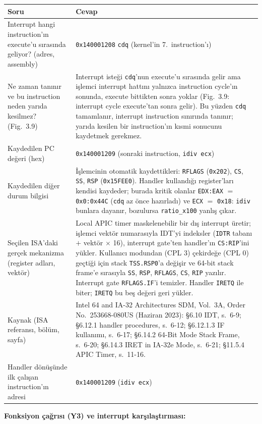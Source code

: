 \documentclass[11pt,a4paper]{article}
\newcommand{\tl}{\texttt}
\newcommand{\hd}[1]{\cellcolor{hdr}#1}
\begin{document}
\begin{longtable}{|p{5.6cm}|p{9.9cm}|}
\hline
\hd{Soru} & \hd{Cevap}\\
\hline
\endhead
Interrupt hangi instruction'ın execute'u sırasında geliyor? (adres, assembly) & \tl{0x140001208} \tl{cdq} (kernel'in 7.~instruction'ı)\\ \hline
Ne zaman tanınır ve bu instruction neden yarıda kesilmez? (Fig.~3.9) & Interrupt isteği \tl{cdq}'nun execute'u sırasında gelir ama işlemci interrupt hattını yalnızca instruction cycle'ın sonunda, execute bittikten sonra yoklar (Fig.~3.9: interrupt cycle execute'tan sonra gelir). Bu yüzden \tl{cdq} tamamlanır, interrupt instruction sınırında tanınır; yarıda kesilen bir instruction'ın kısmi sonucunu kaydetmek gerekmez.\\ \hline
Kaydedilen PC değeri (hex) & \tl{0x140001209} (sonraki instruction, \tl{idiv ecx})\\ \hline
Kaydedilen diğer durum bilgisi & İşlemcinin otomatik kaydettikleri: \tl{RFLAGS} (\tl{0x202}), \tl{CS}, \tl{SS}, \tl{RSP} (\tl{0x15FEE0}). Handler kullandığı register'ları kendisi kaydeder; burada kritik olanlar \tl{EDX:EAX} $=$ \tl{0x0:0x44C} (\tl{cdq} az önce hazırladı) ve \tl{ECX} $=$ \tl{0x18}: \tl{idiv} bunlara dayanır, bozulursa \tl{ratio\_x100} yanlış çıkar.\\ \hline
Seçilen ISA'daki gerçek mekanizma (register adları, vektör) & Local APIC timer maskelenebilir bir dış interrupt üretir; işlemci vektör numarasıyla IDT'yi indeksler (\tl{IDTR} tabanı $+$ vektör $\times$ 16), interrupt gate'ten handler'ın \tl{CS:RIP}'ini yükler. Kullanıcı modundan (CPL 3) çekirdeğe (CPL 0) geçtiği için stack \tl{TSS.RSP0}'a değişir ve 64-bit stack frame'e sırasıyla \tl{SS}, \tl{RSP}, \tl{RFLAGS}, \tl{CS}, \tl{RIP} yazılır. Interrupt gate \tl{RFLAGS.IF}'i temizler. Handler \tl{IRETQ} ile biter; \tl{IRETQ} bu beş değeri geri yükler.\\ \hline
Kaynak (ISA referansı, bölüm, sayfa) & Intel 64 and IA-32 Architectures SDM, Vol.~3A, Order No.~253668-080US (Haziran 2023): §6.10 IDT, s.~6-9; §6.12.1 handler procedures, s.~6-12; §6.12.1.3 IF kullanımı, s.~6-17; §6.14.2 64-Bit Mode Stack Frame, s.~6-20; §6.14.3 IRET in IA-32e Mode, s.~6-21; §11.5.4 APIC Timer, s.~11-16.\\ \hline
Handler dönüşünde ilk çalışan instruction'ın adresi & \tl{0x140001209} (\tl{idiv ecx})\\ \hline
\end{longtable}

\textbf{Fonksiyon çağrısı (Y3) ve interrupt karşılaştırması:}
\end{document}

